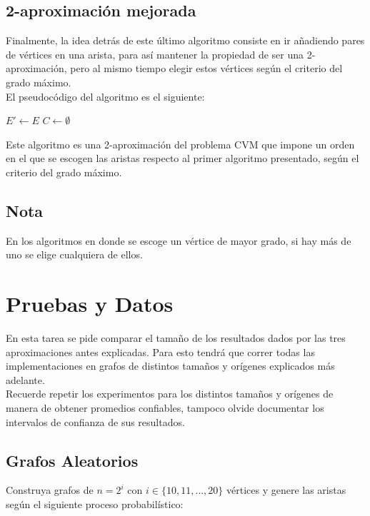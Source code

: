 \documentclass[dcc,uchile]{fcfmcourse}
\begin{document}
\subsection*{2-aproximación mejorada}
Finalmente, la idea detrás de este último algoritmo consiste en ir añadiendo pares de vértices en una arista, para así mantener la propiedad de ser una 2-aproximación, pero al mismo tiempo elegir estos vértices según el criterio del grado máximo.\\

El pseudocódigo del algoritmo es el siguiente:\\

\begin{algorithm}[H]

\SetAlgoLined
{}
 $E'\gets E$\;
 $C\gets \emptyset$\;
 \caption{Este algoritmo es una 2-aproximación del problema CVM que impone un orden en el que se escogen las aristas respecto al primer algoritmo presentado, según el criterio del grado máximo.}
 
 
\end{algorithm}

\subsection*{Nota}
En los algoritmos en donde se escoge un vértice de mayor grado, si hay más de uno se elige cualquiera de ellos.
\section{Pruebas y Datos}
En esta tarea se pide comparar el tamaño de los resultados dados por las tres aproximaciones antes explicadas. Para esto tendrá que correr todas las implementaciones en grafos de distintos tamaños y orígenes explicados más adelante.\\
Recuerde repetir los experimentos para los distintos tamaños y orígenes de manera de obtener promedios confiables, tampoco olvide documentar los intervalos de confianza de sus resultados.
\subsection*{Grafos Aleatorios}
Construya grafos de $n = 2^i$ con $i \in \{10, 11, \ldots, 20\}$ vértices y genere las aristas según el siguiente proceso probabilístico:\\
\end{document}

